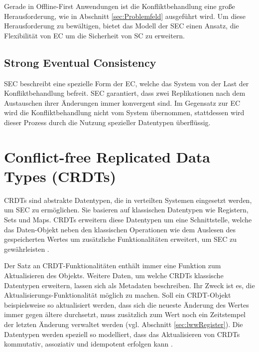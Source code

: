 \documentclass[a4paper, 12pt]{scrreprt}
\begin{document}
Gerade in Offline-First Anwendungen ist die Konfliktbehandlung eine große Herausforderung, wie in Abschnitt \ref{sec:Problemfeld} ausgeführt wird. Um diese Herausforderung zu bewältigen, bietet das Modell der \acf{SEC} einen Ansatz, die Flexibilität von \ac{EC} um die Sicherheit von \ac{SC} zu erweitern. 




\subsection{Strong Eventual Consistency}


\ac{SEC} beschreibt eine spezielle Form der \acf{EC}, welche das System von der Last der Konfliktbehandlung befreit. \ac{SEC} garantiert, dass zwei Replikationen nach dem Austauschen ihrer Änderungen immer konvergent sind. Im Gegensatz zur \ac{EC} wird die Konfliktbehandlung nicht vom System übernommen, stattdessen wird dieser Prozess durch die Nutzung spezieller Datentypen überflüssig. 


\section{Conflict-free Replicated Data Types (CRDTs)}
\label{sec:CRDTs}

\acp{CRDT} sind abstrakte Datentypen, die in verteilten Systemen eingesetzt werden, um \ac{SEC} zu ermöglichen. Sie basieren auf klassischen Datentypen wie Registern, Sets und Maps. \acp{CRDT} erweitern diese Datentypen um eine Schnittstelle, welche das Daten-Objekt neben den klassischen Operationen wie dem Auslesen des gespeicherten Wertes um zusätzliche Funktionalitäten erweitert, um \ac{SEC} zu gewährleisten \autocite[S.~1]{ArticleCRDTOverview}. 

Der Satz an CRDT-Funktionalitäten enthält immer eine Funktion zum Aktualisieren des Objekts. Weitere Daten, um welche \acp{CRDT} klassische Datentypen erweitern, lassen sich als Metadaten beschreiben. Ihr Zweck ist es, die Aktualisierungs-Funktionalität möglich zu machen. Soll ein CRDT-Objekt beispielsweise so aktualisiert werden, dass sich die neueste Änderung des Wertes immer gegen ältere durchsetzt, muss zusätzlich zum Wert noch ein Zeitstempel der letzten Änderung verwaltet werden (vgl. Abschnitt \ref{sec:lwwRegister}).
Die Datentypen werden speziell so modelliert, dass das Aktualisieren von \acp{CRDT} kommutativ, assoziativ und idempotent erfolgen kann \autocite{InproceedingsCrdtsInProduction}.
\end{document}
